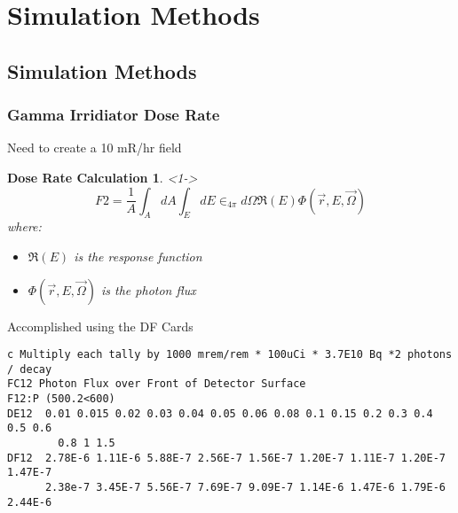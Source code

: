 
% 
%
\section{Simulation Methods}

\subsection{Simulation Methods}

\begin{frame}[fragile]
\frametitle{Gamma Irridiator Dose Rate}
	\small
	Need to create a 10 mR/hr field
	\newtheorem{thm10}{Dose Rate Calculation}
	\begin{thm10}<1->
		$$F2 = \frac{1}{A} \int_{A}{dA}\int_{E}{dE}\in_{4\pi}{d \Omega \Re(E) \Phi(\vec{r},E,\vec{\Omega})} $$
	where:
	\begin{itemize}
		\item $\Re(E)$ is the response function
		\item $\Phi(\vec{r},E,\vec{\Omega})$ is the photon flux
	\end{itemize}
	\end{thm10}
Accomplished using the DF Cards
\begin{lstlisting}
c Multiply each tally by 1000 mrem/rem * 100uCi * 3.7E10 Bq *2 photons / decay
FC12 Photon Flux over Front of Detector Surface
F12:P (500.2<600)
DE12  0.01 0.015 0.02 0.03 0.04 0.05 0.06 0.08 0.1 0.15 0.2 0.3 0.4 0.5 0.6  
		0.8 1 1.5
DF12  2.78E-6 1.11E-6 5.88E-7 2.56E-7 1.56E-7 1.20E-7 1.11E-7 1.20E-7 1.47E-7
      2.38e-7 3.45E-7 5.56E-7 7.69E-7 9.09E-7 1.14E-6 1.47E-6 1.79E-6 2.44E-6
\end{lstlisting}
\end{frame}

